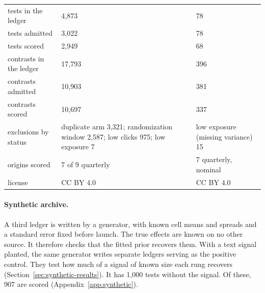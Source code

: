 \documentclass[sigconf,nonacm]{acmart}
\begin{document}
\begin{table}[t]
\begin{tabular}{p{}p{}p{}}
tests in the ledger & 4,873 & 78 \\
tests admitted & 3,022 & 78 \\
tests scored & 2,949 & 68 \\
contrasts in the ledger & 17,793 & 396 \\
contrasts admitted & 10,903 & 381 \\
contrasts scored & 10,697 & 337 \\
exclusions by status & duplicate arm 3,321; randomization window 2,587; low clicks 975; low exposure 7 & low exposure (missing variance) 15 \\
origins scored & 7 of 9 quarterly & 7 quarterly, nominal \\
license & CC BY 4.0 & CC BY 4.0 \\
\bottomrule
\end{tabular}
\end{table}

\paragraph{Synthetic archive.} A third ledger is written by a generator, with known cell means and spreads and a standard error fixed before launch. The true effects are known on no other source. It therefore checks that the fitted prior recovers them. With a text signal planted, the same generator writes separate ledgers serving as the positive control. They test how much of a signal of known size each rung recovers (Section~\ref{sec:synthetic-results}).
It has 1,000 tests without the signal. Of these, 907 are scored (Appendix~\ref{app:synthetic}).
\end{document}
